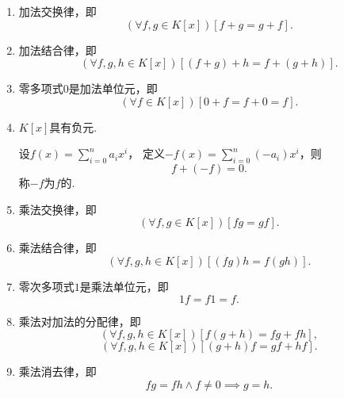 \begin{enumerate}
	\item 加法交换律，即\begin{equation*}
		(\forall f,g \in K[x])[f+g=g+f].
	\end{equation*}

	\item 加法结合律，即\begin{equation*}
		(\forall f,g,h \in K[x])[(f+g)+h=f+(g+h)].
	\end{equation*}

	\item 零多项式\(0\)是加法单位元，即\begin{equation*}
		(\forall f \in K[x])[0+f=f+0=f].
	\end{equation*}

	\item \(K[x]\)具有负元.

	设\(f(x)=\sum_{i=0}^n a_i x^i\)，
	定义\(-f(x)=\sum_{i=0}^n (-a_i) x^i\)，则\begin{equation*}
		f+(-f)=0.
	\end{equation*}
	称\(-f\)为\(f\)的.

	\item 乘法交换律，即\begin{equation*}
		(\forall f,g \in K[x])[fg=gf].
	\end{equation*}

	\item 乘法结合律，即\begin{equation*}
		(\forall f,g,h \in K[x])[(fg)h=f(gh)].
	\end{equation*}

	\item 零次多项式\(1\)是乘法单位元，即\begin{equation*}
		1f=f1=f.
	\end{equation*}

	\item 乘法对加法的分配律，即\begin{equation*}
		(\forall f,g,h \in K[x])[f(g+h)=fg+fh],
	\end{equation*}\begin{equation*}
		(\forall f,g,h \in K[x])[(g+h)f=gf+hf].
	\end{equation*}

	\item 乘法消去律，即\begin{equation*}
		fg=fh \land f\neq0 \implies g=h.
	\end{equation*}
\end{enumerate}

